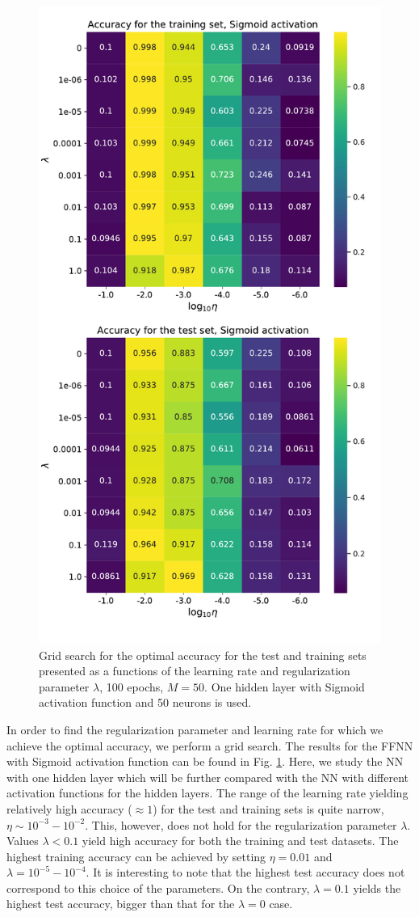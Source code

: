 \documentclass{emulateapj}
\begin{document}
\begin{figure}[t!]
    \centering
    \includegraphics[width=.49\textwidth]{Figures/Class_ridge_1_layer.pdf}
    \caption{Grid search for the optimal accuracy for the test and training sets presented as a functions of the learning rate and regularization parameter $\lambda$, 100 epochs, $M=50$. One hidden layer with Sigmoid activation function and 50 neurons is used.}
    \label{fig: grid search class 1 layer}
\end{figure}

In order to find the regularization parameter and learning rate for which we achieve the optimal accuracy, we perform a grid search. The results for the FFNN with Sigmoid activation function can be found in Fig. \ref{fig: grid search class 1 layer}. Here, we study the NN with one hidden layer which will be further compared with the NN with different activation functions for the hidden layers. The range of the learning rate yielding relatively high accuracy ($\approx 1$) for the test and training sets is quite narrow, $\eta\sim 10^{-3}-10^{-2}$. This, however, does not hold for the regularization parameter $\lambda$. Values $\lambda<0.1$ yield high accuracy for both the training and test datasets. The highest training accuracy can be achieved by setting $\eta=0.01$ and $\lambda=10^{-5}-10^{-4}$. It is interesting to note that the highest test accuracy does not correspond to this choice of the parameters. On the contrary, $\lambda=0.1$ yields the highest test accuracy, bigger than that for the $\lambda=0$ case.
\end{document}
